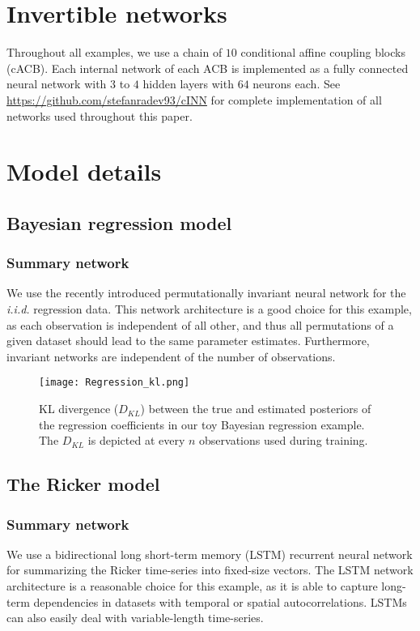 \documentclass[9pt,twoside,lineno]{pnas-new}
\begin{document}
\section*{Invertible networks}
Throughout all examples, we use a chain of $10$ conditional affine coupling blocks (cACB). Each internal network of each ACB is implemented as a fully connected neural network with $3$ to $4$ hidden layers with $64$ neurons each. See \href{https://github.com/stefanradev93/cINN}{https://github.com/stefanradev93/cINN} for complete implementation of all networks used throughout this paper.

\section*{Model details}

\subsection*{Bayesian regression model}

\subsubsection*{Summary network}
We use the recently introduced permutationally invariant neural network \cite{bloem2019probabilistic} for the \textit{i.i.d.} regression data. This network architecture is a good choice for this example, as each observation is independent of all other, and thus all permutations of a given dataset should lead to the same parameter estimates. Furthermore, invariant networks are independent of the number of observations.

\begin{figure}
\centering
\texttt{[image: Regression\_kl.png]}
\caption{KL divergence ($D_{KL}$) between the true and estimated posteriors of the regression coefficients in our toy Bayesian regression example. The $D_{KL}$ is depicted at every $n$ observations used during training.} 
\end{figure}

\subsection*{The Ricker model}

\subsubsection*{Summary network}
We use a bidirectional long short-term memory (LSTM) recurrent neural network \cite{gers1999learning} for summarizing the Ricker time-series into fixed-size vectors. The LSTM network architecture is a reasonable choice for this example, as it is able to capture long-term dependencies in datasets with temporal or spatial autocorrelations. LSTMs can also easily deal with variable-length time-series.
\end{document}
